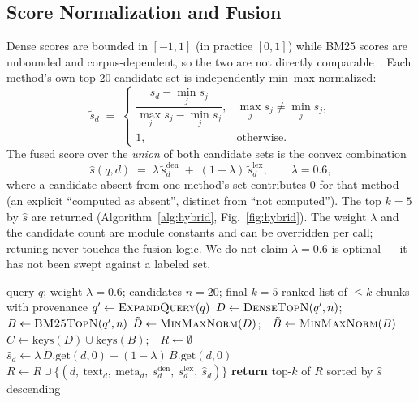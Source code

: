 \subsection{Score Normalization and Fusion}
Dense scores are bounded in $[-1,1]$ (in practice $[0,1]$) while BM25
scores are unbounded and corpus-dependent, so the two are not directly
comparable~\cite{bruch2023fusion}. Each method's own top-$20$ candidate
set is independently min--max normalized:
\begin{equation}
\tilde s_d \;=\;
\begin{cases}
\dfrac{s_d - \min_j s_j}{\max_j s_j - \min_j s_j}, & \max_j s_j \ne \min_j s_j,\\[2ex]
1, & \text{otherwise.}
\end{cases}
\label{eq:norm}
\end{equation}
The fused score over the \emph{union} of both candidate sets is the convex
combination
\begin{equation}
\hat s(q,d) \;=\; \lambda\,\tilde s^{\mathrm{den}}_d
\;+\; (1-\lambda)\,\tilde s^{\mathrm{lex}}_d,
\qquad \lambda = 0.6,
\label{eq:fusion}
\end{equation}
where a candidate absent from one method's set contributes $0$ for that
method (an explicit ``computed as absent'', distinct from ``not
computed''). The top $k=5$ by $\hat s$ are returned
(Algorithm~\ref{alg:hybrid}, Fig.~\ref{fig:hybrid}). The weight
$\lambda$ and the candidate count are module constants and can be
overridden per call; retuning never touches the fusion logic. We do not
claim $\lambda = 0.6$ is optimal --- it has not been swept against a
labeled set.

\begin{algorithm}[!t]
\caption{Hybrid Dense + BM25 Retrieval}
\label{alg:hybrid}
\begin{algorithmic}[1]
\Require query $q$; weight $\lambda{=}0.6$; candidates $n{=}20$; final $k{=}5$
\Ensure ranked list of $\le k$ chunks with provenance
\State $q' \gets \textsc{ExpandQuery}(q)$ 
\State $D \gets \textsc{DenseTopN}(q', n)$;\ \ $B \gets \textsc{BM25TopN}(q', n)$
\State $\tilde D \gets \textsc{MinMaxNorm}(D)$;\ \ $\tilde B \gets \textsc{MinMaxNorm}(B)$
\State $C \gets \mathrm{keys}(D) \cup \mathrm{keys}(B)$;\ \ $R \gets \emptyset$
   \State $\hat s_d \gets \lambda\,\tilde D.\text{get}(d,0) + (1-\lambda)\,\tilde B.\text{get}(d,0)$
   \State $R \gets R \cup \{(d,\ \text{text}_d,\ \text{meta}_d,\ s^{\mathrm{den}}_d,\ s^{\mathrm{lex}}_d,\ \hat s_d)\}$
\EndFor
\State \textbf{return} top-$k$ of $R$ sorted by $\hat s$ descending
\end{algorithmic}
\end{algorithm}

